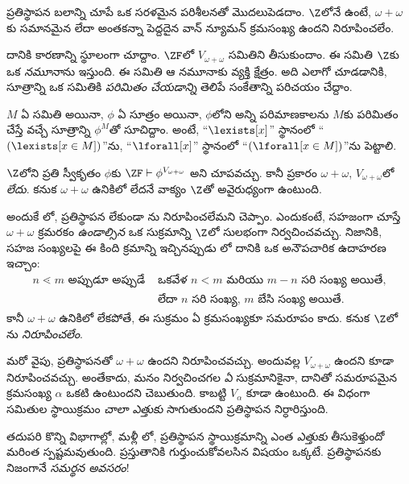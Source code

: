 \documentclass[../../../include/open-logic-section]{subfiles}
\begin{document}

ప్రతిస్థాపన బలాన్ని చూపే ఒక సరళమైన పరిశీలనతో మొదలుపెడదాం.
$\Z$లోనే ఉంటే, $\omega + \omega$కు సమానమైన లేదా అంతకన్నా
పెద్దదైన వాన్ న్యూమన్ క్రమసంఖ్య ఉందని నిరూపించలేం.

దానికి కారణాన్ని స్థూలంగా చూద్దాం. $\ZF$లో
$V_{\omega+\omega}$ సమితిని తీసుకుందాం. ఈ సమితి
$\Z$కు ఒక \emph{నమూనా}ను ఇస్తుంది. ఈ సమితి ఆ నమూనాకు వ్యక్తి క్షేత్రం.
అది ఎలాగో చూడడానికి, సూత్రాన్ని ఒక సమితికి
\emph{పరిమితం చేయడాన్ని} తెలిపే సంకేతాన్ని పరిచయం చేద్దాం.
\begin{defn}
	$M$ ఏ సమితి అయినా, $\phi$ ఏ సూత్రం అయినా, $\phi$లోని అన్ని
	పరిమాణకాలను $M$కు పరిమితం చేస్తే వచ్చే సూత్రాన్ని
	$\phi^M$తో సూచిద్దాం. అంటే, ``$\lexists[x]$'' స్థానంలో
	``$(\lexists[x \in M])$''ను, ``$\lforall[x]$'' స్థానంలో
	``$(\lforall[x \in M])$''ను పెట్టాలి.
\end{defn}\noindent
$\Z$లోని ప్రతి స్వీకృతం $\phi$కు $\ZF \vdash
\phi^{V_{\omega+\omega}}$ అని చూపవచ్చు. కానీ  ప్రకారం $\omega+\omega$, $V_{\omega+\omega}$లో \emph{లేదు}. కనుక $\omega+\omega$ ఉనికిలో లేదనే వాక్యం $\Z$తో అవైరుధ్యంగా ఉంటుంది.

అందుకే లో, ప్రతిస్థాపన లేకుండా ను నిరూపించలేమని చెప్పాం. ఎందుకంటే, సహజంగా చూస్తే $\omega+\omega$ క్రమరకం \emph{ఉండాల్సిన}
ఒక సుక్రమాన్ని $\Z$లో సులభంగా నిర్వచించవచ్చు. నిజానికి, సహజ సంఖ్యలపై ఈ కింది క్రమాన్ని ఇచ్చినప్పుడు లో దానికి ఒక అనౌపచారిక ఉదాహరణ ఇచ్చాం:
\begin{align*}
	n \lessdot m \text{ అప్పుడూ అప్పుడే }&\text{ఒకవేళ }n < m\text{ మరియు }m-n\text{ సరి సంఖ్య అయితే,}\\
	& \text{లేదా $n$ సరి సంఖ్య, $m$ బేసి సంఖ్య అయితే.}
\end{align*}
కానీ $\omega+\omega$ ఉనికిలో లేకపోతే, ఈ సుక్రమం ఏ క్రమసంఖ్యకూ సమరూపం కాదు. కనుక $\Z$లో ను \emph{నిరూపించలేం}.

మరో వైపు, ప్రతిస్థాపనతో $\omega+\omega$ ఉందని నిరూపించవచ్చు.
అందువల్ల $V_{\omega+\omega}$ ఉందని కూడా నిరూపించవచ్చు.
అంతేకాదు, మనం నిర్వచించగల \emph{ఏ} సుక్రమానికైనా, దానితో
సమరూపమైన క్రమసంఖ్య $\alpha$ ఒకటి ఉంటుందని
 చెబుతుంది.
కాబట్టి $V_\alpha$ కూడా ఉంటుంది. ఈ విధంగా
సమితుల స్థాయిక్రమం \emph{చాలా ఎత్తుకు} సాగుతుందని ప్రతిస్థాపన నిర్ధారిస్తుంది.

తదుపరి కొన్ని విభాగాల్లో, మళ్లీ లో, ప్రతిస్థాపన స్థాయిక్రమాన్ని ఎంత \emph{ఎత్తుకు} తీసుకెళ్తుందో మరింత స్పష్టమవుతుంది. ప్రస్తుతానికి గుర్తుంచుకోవలసిన విషయం ఒక్కటే. ప్రతిస్థాపనకు
నిజంగానే \emph{సమర్థన అవసరం}!
\end{document}
